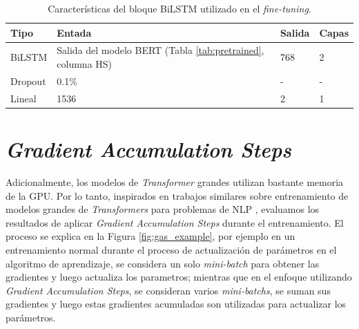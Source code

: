 \begin{table}[t]%
	\centering
	\caption{Características del bloque BiLSTM utilizado en el \textit{fine-tuning}.}
	\label{tab:biLSTM}%
	\setlength{\tabcolsep}{0.5em} %
	{\renewcommand{\arraystretch}{1.5}%
		\begin{tabular}{lp{9cm}p{1cm}p{1cm}}
			\hline
			\textbf{Tipo}   & \textbf{Entada} & \textbf{Salida}& \textbf{Capas} \\ \hline
			
			BiLSTM & Salida del modelo BERT (Tabla \ref{tab:pretrained}, columna HS) & 768 & 2 \\
			
			Dropout & 0.1\% & - & - \\
			Lineal & 1536 & 2 & 1 \\ \hline
	\end{tabular}}
	
\end{table}



\section{\textit{Gradient Accumulation Steps}}\label{sec:gas}

Adicionalmente, los modelos de \textit{Transformer} grandes utilizan bastante memoria de la GPU. Por lo tanto, inspirados en trabajos similares sobre entrenamiento de modelos grandes de \textit{Transformers} para problemas de NLP \citep{anil2021large,zhang2023adam,huang2023measuring}, evaluamos los resultados de aplicar \textit{Gradient Accumulation Steps} durante el entrenamiento. El proceso se explica en la Figura \ref{fig:gas_example}, por ejemplo en un entrenamiento normal durante el proceso de actualización de parámetros en el algoritmo de aprendizaje, se considera un solo \textit{mini-batch} para obtener las gradientes y luego actualiza los parametros; mientras que en el enfoque utilizando \textit{Gradient Accumulation Steps}, se consideran varios \textit{mini-batchs}, se suman sus gradientes y luego estas gradientes acumuladas son utilizadas para actualizar los parámetros.



